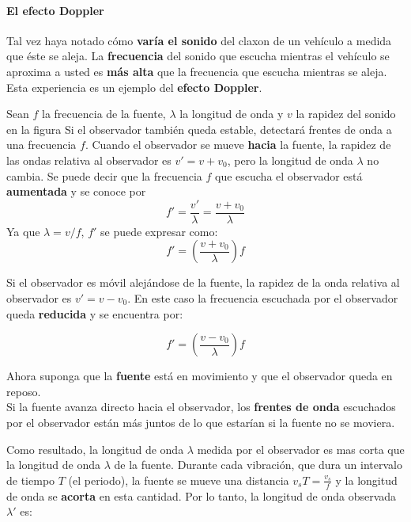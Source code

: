 \documentclass[10pt]{article}
\begin{document}
\paragraph{El efecto Doppler}

Tal vez haya notado cómo \textbf{varía el sonido} del claxon de un vehículo a medida que éste
se aleja. La \textbf{frecuencia} del sonido que escucha mientras el vehículo se aproxima a usted es
\textbf{más alta} que la frecuencia que escucha mientras se aleja. Esta experiencia es un ejemplo
del \textbf{efecto Doppler}.\\
\linebreak

Sean $f$ la frecuencia de la fuente, $\lambda$ la longitud de onda y $v$ la rapidez del sonido en
la figura Si el observador también queda estable, detectará frentes de onda a una frecuencia $f$.
Cuando el observador se mueve \textbf{hacia} la fuente, la rapidez de las ondas
relativa al observador es $v' = v + v_0$, pero la
longitud de onda $\lambda$ no cambia. Se puede decir
que la frecuencia $f$ que escucha el observador está \textbf{aumentada} y se conoce por
\begin{equation*}
	f' = \dfrac{v'}{\lambda} = \dfrac{v+v_0}{\lambda}
\end{equation*}
Ya que $\lambda = v/f$, $f'$ se puede expresar como:
\begin{equation*}
	f' = \left( \dfrac{v+v_0}{\lambda}  \right)f
\end{equation*}

Si el observador es móvil alejándose de la fuente, la rapidez de la onda 
relativa al observador es $v' = v-v_0$. En este caso la frecuencia escuchada por el observador queda \textbf{reducida}
y se encuentra por:

\begin{equation*}
	f' = \left( \dfrac{v-v_0}{\lambda}  \right)f
\end{equation*}


Ahora suponga que la \textbf{fuente} está en movimiento y que el observador queda en reposo.\\
Si la fuente avanza directo hacia el observador, los \textbf{frentes de onda} escuchados por el observador están más juntos de lo que estarían si la fuente no se moviera.


Como resultado, la longitud de onda $\lambda$ medida por el observador es mas corta que la
longitud de onda $\lambda$ de la fuente. Durante cada vibración, que dura un intervalo de tiempo
$T$ (el periodo), la fuente se mueve una distancia $v_sT = \frac{v_s}{f}$ y la longitud de onda se \textbf{acorta}
en esta cantidad. Por lo tanto, la longitud de onda observada $\lambda'$ es:
\end{document}
